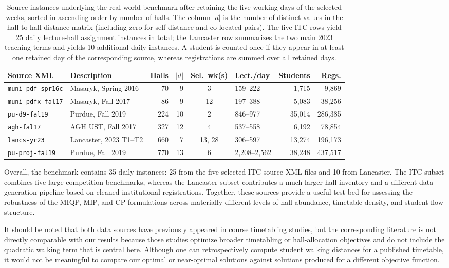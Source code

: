 \documentclass[11pt]{article}
\begin{document}
\begin{table}[t]
\centering
\scriptsize
\begin{tabular}{@{}llrrclrr@{}}
\hline
Source XML & Description & Halls & $|d|$ & Sel.\ wk(s) & Lect./day & Students & Regs. \\
\hline
\texttt{muni-pdf-spr16c} & Masaryk, Spring 2016 & 70 & 9 & 3 & 159--222 & 1,715 & 9,869 \\
\texttt{muni-pdfx-fal17} & Masaryk, Fall 2017 & 86 & 9 & 12 & 197--388 & 5,083 & 38,256 \\
\texttt{pu-d9-fal19} & Purdue, Fall 2019 & 224 & 10 & 2 & 846--977 & 35,014 & 286,385 \\
\texttt{agh-fal17} & AGH UST, Fall 2017 & 327 & 12 & 4 & 537--558 & 6,192 & 78,854 \\
\texttt{lancs-yr23} & Lancaster, 2023 T1--T2 & 660 & 7 & 13, 28 & 306--597 & 13,274 & 196,173 \\
\texttt{pu-proj-fal19} & Purdue, Fall 2019 & 770 & 13 & 6 & 2,208--2,562 & 38,248 & 437,517 \\
\hline
\end{tabular}
\caption{Source instances underlying the real-world benchmark after retaining the five working days of the selected weeks, sorted in ascending order by number of halls. The column $|d|$ is the number of distinct values in the hall-to-hall distance matrix (including zero for self-distance and co-located pairs). The five ITC rows yield 25 daily lecture-hall assignment instances in total; the Lancaster row summarizes the two main 2023 teaching terms and yields 10 additional daily instances. A student is counted once if they appear in at least one retained day of the corresponding source, whereas registrations are summed over all retained days.}
\label{tab:instance_sources}
\end{table}

Overall, the benchmark contains 35 daily instances: 25 from the five selected ITC source XML files and 10 from Lancaster. The ITC subset combines five large competition benchmarks, whereas the Lancaster subset contributes a much larger hall inventory and a different data-generation pipeline based on cleaned institutional registrations. Together, these sources provide a useful test bed for assessing the robustness of the MIQP, MIP, and CP formulations across materially different levels of hall abundance, timetable density, and student-flow structure.

It should be noted that both data sources have previously appeared in course timetabling studies, but the corresponding literature is not directly comparable with our results because those studies optimize broader timetabling or hall-allocation objectives and do not include the quadratic walking term that is central here. Although one can retrospectively compute student walking distances for a published timetable, it would not be meaningful to compare our optimal or near-optimal solutions against solutions produced for a different objective function.
\end{document}
